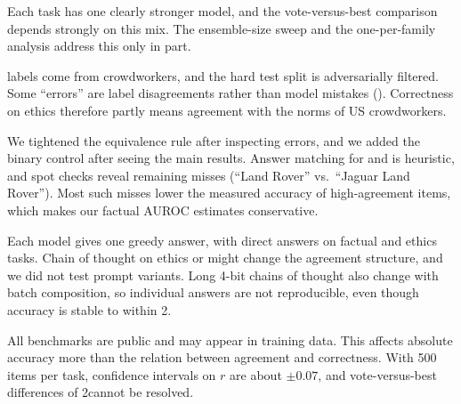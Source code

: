 Each task has one clearly stronger model, and the vote-versus-best comparison depends strongly on this mix.
The ensemble-size sweep and the one-per-family analysis address this only in part.

\ethics labels come from crowdworkers, and the hard test split is adversarially filtered.
Some ``errors'' are label disagreements rather than model mistakes ().
Correctness on ethics therefore partly means agreement with the norms of US crowdworkers.

We tightened the \triviaqa equivalence rule after inspecting errors, and we added the binary control after seeing the main results.
Answer matching for \triviaqa and \mathfive is heuristic, and spot checks reveal remaining misses (\eg ``Land Rover'' vs.\ ``Jaguar Land Rover'').
Most such misses lower the measured accuracy of high-agreement items, which makes our factual AUROC estimates conservative.

Each model gives one greedy answer, with direct answers on factual and ethics tasks.
Chain of thought on ethics or \mmlu might change the agreement structure, and we did not test prompt variants.
Long 4-bit chains of thought also change with batch composition, so individual \mathfive answers are not reproducible, even though accuracy is stable to within 2\pp.

All benchmarks are public and may appear in training data.
This affects absolute accuracy more than the relation between agreement and correctness.
With 500 items per task, confidence intervals on $r$ are about $\pm 0.07$, and vote-versus-best differences of 2\pp cannot be resolved.
